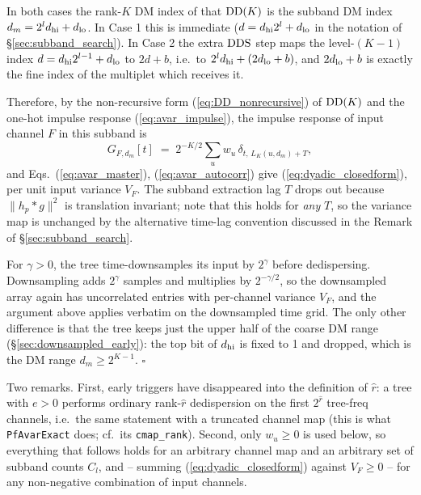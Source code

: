 \documentclass{article}
\numberwithin{equation}{section}   %
\def\DDS{{\rm DDS}}
\def\DD{{\rm DD}}
\begin{document}
In both cases the rank-$K$ DM index of that $\DD(K)$ is the subband DM index
$d_m = 2^l d_{\rm hi} + d_{\rm lo}$. In Case 1 this is immediate ($d = d_{\rm hi}2^l +
d_{\rm lo}$ in the notation of \S\ref{sec:subband_search}). In Case 2 the extra $\DDS$ step
maps the level-$(K-1)$ index $d = d_{\rm hi}2^{l-1} + d_{\rm lo}$ to $2d + b$, i.e.\ to
$2^l d_{\rm hi} + (2 d_{\rm lo} + b)$, and $2d_{\rm lo}+b$ is exactly the fine index of the
multiplet which receives it.

Therefore, by the non-recursive form (\ref{eq:DD_nonrecursive}) of $\DD(K)$ and the one-hot
impulse response (\ref{eq:avar_impulse}), the impulse response of input channel $F$ in this
subband is
\begin{equation}
G_{F,d_m}[t] \;=\; 2^{-K/2} \sum_u w_u \, \delta_{t,\, L_K(u,d_m) + T},
\label{eq:dyadic_impulse}
\end{equation}
and Eqs.\ (\ref{eq:avar_master}), (\ref{eq:avar_autocorr}) give (\ref{eq:dyadic_closedform}),
per unit input variance $V_F$. The subband extraction lag $T$ drops out because
$\|h_p * g\|^2$ is translation invariant; note that this holds for {\em any} $T$, so the
variance map is unchanged by the alternative time-lag convention discussed in the Remark of
\S\ref{sec:subband_search}.

For $\gamma>0$, the tree time-downsamples its input by $2^\gamma$ before dedispersing.
Downsampling adds $2^\gamma$ samples and multiplies by $2^{-\gamma/2}$, so the downsampled
array again has uncorrelated entries with per-channel variance $V_F$, and the argument above
applies verbatim on the downsampled time grid. The only other difference is that the tree
keeps just the upper half of the coarse DM range (\S\ref{sec:downsampled_early}): the top bit
of $d_{\rm hi}$ is fixed to 1 and dropped, which is the DM range $d_m \ge 2^{K-1}$. $\square$

\medskip
\par\noindent
Two remarks. First, early triggers have disappeared into the definition of $\hat r$: a tree
with $e>0$ performs ordinary rank-$\hat r$ dedispersion on the first $2^{\hat r}$ tree-freq
channels, i.e.\ the same statement with a truncated channel map (this is what
{\tt PfAvarExact} does; cf.\ its {\tt cmap\_rank}). Second, only $w_u \ge 0$ is used below,
so everything that follows holds for an arbitrary channel map and an arbitrary set of subband
counts $C_l$, and -- summing (\ref{eq:dyadic_closedform}) against $V_F \ge 0$ -- for any
non-negative combination of input channels.
\end{document}
